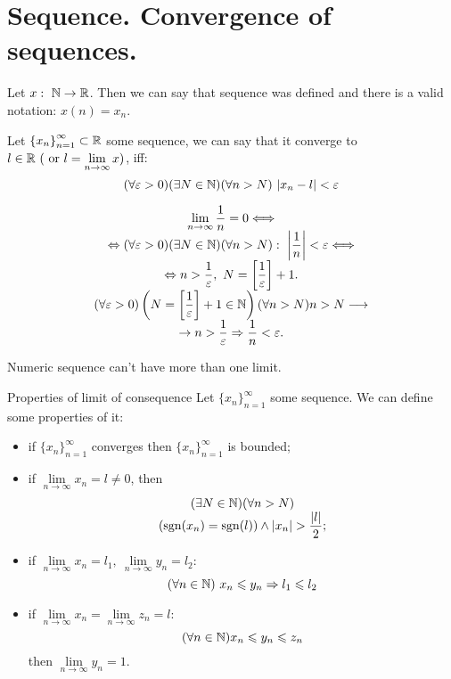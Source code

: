 \section{Sequence. Convergence of sequences.}
Let $x: \ \mathbb{N} \to \mathbb{R}$. Then we can say that sequence was defined and there is a valid notation: $x(n) = x_n$.

\begin{definition}{}{}
    Let $\left\{x_n\right\}_{n=1}^\infty \subset \mathbb{R}$ some sequence, we can say that it converge to $l \in \mathbb{R} \ (\text{ or } l = \lim\limits_{n\to \infty}x)$, iff:
    \[
        (\forall \varepsilon > 0) (\exists N \in \mathbb{N}) (\forall n > N) \ |x_n - l| < \varepsilon
    \] 
\end{definition}

\example 
\useshortskip
\[
    \begin{array}{c}
       \lim\limits_{n\to \infty} \dfrac{1}{n} = 0 \Longleftrightarrow \\
       \Leftrightarrow (\forall \varepsilon > 0) (\exists N \in \mathbb{N})(\forall n > N): \ \left|\dfrac{1}{n} \right| < \varepsilon \Longleftrightarrow \\
       \Leftrightarrow n> \dfrac{1}{\varepsilon}, \ N = \left[ \dfrac{1}{\varepsilon}\right] + 1. \\ (\forall \varepsilon > 0) \left(N = \left[\dfrac{1}{\varepsilon}\right] + 1 \in \mathbb{N}\right) (\forall n > N) n > N \longrightarrow \\ \rightarrow n > 
       \dfrac{1}{\varepsilon} \Rightarrow \dfrac{1}{n} < \varepsilon.
    \end{array}  
\]
\begin{theorema}{}{}
  Numeric sequence can't have more than one limit.  
\end{theorema}

\begin{theorema}{Properties of limit of consequence}{}
    Let $\{x_n\}_{n=1}^\infty$ some sequence. We can define some properties of it:
    \begin{itemize}
        \item if $\{x_n\}_{n=1}^\infty$ converges then $\{x_n\}_{n=1}^\infty$ is bounded;
        \item if $\lim\limits_{n\to \infty} x_n = l \neq 0$, then 
        \useshortskip
        \[
            \begin{array}{c}
                (\exists N \in \mathbb{N}) (\forall n > N)\\
                (\operatorname{sgn} (x_n) = \operatorname{sgn}(l)) \wedge |x_n| > \dfrac{|l|}{2};
            \end{array}
        \]
        \item if $\lim\limits_{n\to \infty} x_n = l_1, \ \lim\limits_{n\to \infty} y_n = l_2$:
        \useshortskip
        \[
            (\forall n \in \mathbb{N}) \ x_n \leqslant y_n \Rightarrow l_1 \leqslant l_2  
        \]
        \item if $\lim\limits_{n\to \infty} x_n = \lim\limits_{n\to \infty} z_n = l$:
        \useshortskip
        \[
            (\forall n \in \mathbb{N}) x_n \leqslant y_n \leqslant z_n   
        \]
        \useshortskip
        then $\lim\limits_{n\to \infty} y_n = 1$.
    \end{itemize}
\end{theorema}

